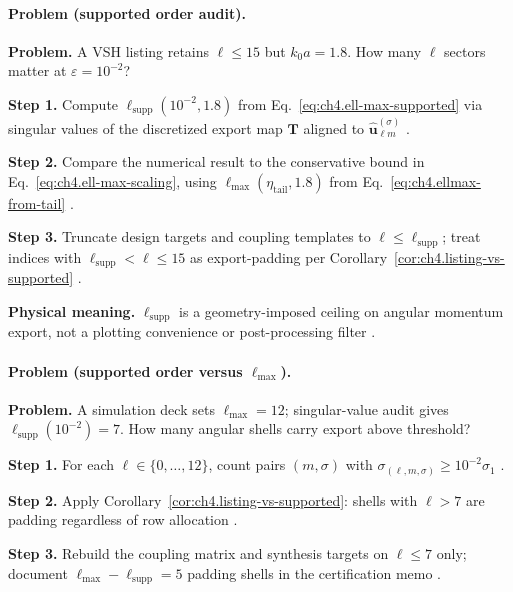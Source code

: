 \paragraph{Problem (supported order audit).}
\textbf{Problem.} A VSH listing retains \(\ell\le15\) but \(k_{0}a=1.8\). How many \(\ell\) sectors matter at \(\varepsilon=10^{-2}\)?

\textbf{Step 1.} Compute \(\ell_{\mathrm{supp}}(10^{-2},1.8)\) from Eq.~\eqref{eq:ch4.ell-max-supported} via singular values of the
discretized export map \(\mathbf{T}\) aligned to \(\widehat{\mathbf{u}}_{\ell m}^{(\sigma)}\) \cite{harrington2001,hansen1988}.

\textbf{Step 2.} Compare the numerical result to the conservative bound in Eq.~\eqref{eq:ch4.ell-max-scaling}, using
\(\ell_{\max}(\eta_{\mathrm{tail}},1.8)\) from Eq.~\eqref{eq:ch4.ellmax-from-tail} \cite{hansen1988,jackson1999,stratton1941}.

\textbf{Step 3.} Truncate design targets and coupling templates to \(\ell\le\ell_{\mathrm{supp}}\); treat indices with
\(\ell_{\mathrm{supp}}<\ell\le15\) as export-padding per Corollary~\ref{cor:ch4.listing-vs-supported} \cite{devaney2004,harrington2001}.

\textbf{Physical meaning.} \(\ell_{\mathrm{supp}}\) is a geometry-imposed ceiling on angular momentum export, not a plotting convenience
or post-processing filter \cite{hansen1988,stratton1941}.

\paragraph{Problem (supported order versus \(\ell_{\max}\)).}
\textbf{Problem.} A simulation deck sets \(\ell_{\max}=12\); singular-value audit gives \(\ell_{\mathrm{supp}}(10^{-2})=7\). How many
angular shells carry export above threshold?

\textbf{Step 1.} For each \(\ell\in\{0,\ldots,12\}\), count pairs \((m,\sigma)\) with
\(\sigma_{(\ell,m,\sigma)}\ge10^{-2}\sigma_{1}\) \cite{harrington2001,hansen1988}.

\textbf{Step 2.} Apply Corollary~\ref{cor:ch4.listing-vs-supported}: shells with \(\ell>7\) are padding regardless of row allocation
\cite{hansen1988,devaney2004}.

\textbf{Step 3.} Rebuild the coupling matrix and synthesis targets on \(\ell\le7\) only; document \(\ell_{\max}-\ell_{\mathrm{supp}}=5\)
padding shells in the certification memo \cite{stratton1941,collin2001}.

